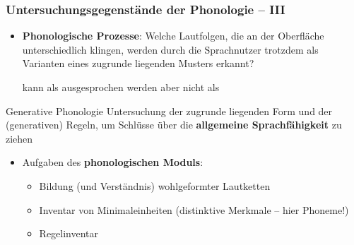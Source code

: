 \begin{frame}
\frametitle{Untersuchungsgegenstände der Phonologie -- III}
	
\begin{itemize}		
	\item \textbf{Phonologische Prozesse}: Welche Lautfolgen, die an der Oberfläche unterschiedlich klingen, werden durch die Sprachnutzer trotzdem als Varianten eines zugrunde liegenden Musters erkannt?

\ea \textipa{[ga{\textscr}t@n]} kann als \textipa{[ga:d\textsyllabic{n}]} ausgesprochen werden aber nicht als 
\textipa{[ga:b\s{m}]}
\z

\end{itemize}


\begin{block}{Generative Phonologie}
	Untersuchung der zugrunde liegenden Form und der (generativen) Regeln, um Schlüsse über die \textbf{allgemeine Sprachfähigkeit} zu ziehen
\end{block}

      
\begin{itemize}

\item Aufgaben des \textbf{phonologischen Moduls}:
	
	\begin{itemize}
		\item Bildung (und Verständnis) wohlgeformter Lautketten
		\item Inventar von Minimaleinheiten (distinktive Merkmale -- hier Phoneme!)
		\item Regelinventar
	\end{itemize}
	 
\end{itemize}

\end{frame}


